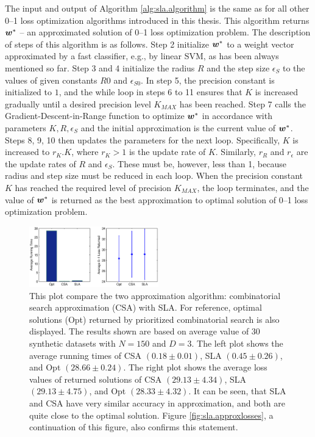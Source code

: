 The input and output of Algorithm \ref{alg:sla.algorithm} is the same
as for all other 0--1 loss optimization algorithms introduced in this
thesis. This algorithm returns $\boldsymbol{w}^*$ -- an approximated solution of
0--1 loss optimization problem. The description of steps of this
algorithm is as follows. Step 2 initialize $\boldsymbol{w}^*$ to a weight vector
approximated by a fast classifier, e.g., by linear SVM, as has been
always mentioned so far. Step 3 and 4 initialize the radius $R$ and
the step size $\epsilon_S$ to the values of given constants $R0$ and
$\epsilon_{S0}$. In step 5, the precision constant is initialized to
$1$, and the while loop in steps 6 to 11 ensures that $K$ is increased
gradually until a desired precision level $K_{MAX}$ has been
reached. Step 7 calls the {\sc Gradient-Descent-in-Range} function to
optimize $\boldsymbol{w}^*$ in accordance with parameters $K, R, \epsilon_S$ and
the initial approximation is the current value of $\boldsymbol{w}^*$. Steps 8, 9,
10 then updates the parameters for the next loop. Specifically, $K$ is
increased to $r_K.K$, where $r_K>1$ is the update rate of
$K$. Similarly, $r_R$ and $r_\epsilon$ are the update rates of $R$ and
$\epsilon_S$. These must be, however, less than 1, because radius and
step size must be reduced in each loop. When the precision constant
$K$ has reached the required level of precision $K_{MAX}$, the loop
terminates, and the value of $\boldsymbol{w}^*$ is returned as the best
approximation to optimal solution of 0--1 loss optimization problem.

\begin{figure}[here]
\includegraphics[width=0.50\textwidth]{images/fig54_approxsumm.eps}
\caption{ This plot compare the two approximation algorithm:
  combinatorial search approximation (CSA) with SLA. For reference,
  optimal solutions (Opt) returned by prioritized combinatorial search
  is also displayed. The results shown are based on average value of
  30 synthetic datasets with $N=150$ and $D=3$. The left plot shows
  the average running times of CSA $(0.18 \pm 0.01)$, SLA $(0.45 \pm
  0.26)$, and Opt $(28.66 \pm 0.24)$. The right plot shows the average
  loss values of returned solutions of CSA $(29.13 \pm 4.34)$, SLA
  $(29.13 \pm 4.75)$, and Opt $(28.33 \pm 4.32)$. It can be seen, that
  SLA and CSA have very similar accuracy in approximation, and both
  are quite close to the optimal solution. Figure
  \ref{fig:sla.approxlosses}, a continuation of this figure, also
  confirms this statement.  }
\label{fig:sla.approxsumm}
\end{figure}

